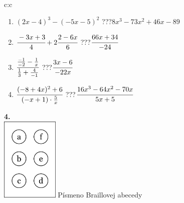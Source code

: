 \documentclass[10pt]{report}
\begin{document}
\begin{tabular}{c:c}
\begin{minipage}[c][104.5mm][t]{0.5\linewidth}
\begin{center}
\begin{minipage}{0.79\linewidth}
\begin{center}
\begin{varwidth}{\linewidth}
\begin{enumerate}
\item $(2x-4)^3-(-5x-5)^2$\quad \dotfill\; ???\;\dotfill \quad $8x^3-73x^2+46x-89$
\item $\cfrac{-3x+3}{4}+2\cfrac{2-6x}{6}$\quad \dotfill\; ???\;\dotfill \quad $\cfrac{66x+34}{-24}$
\item $\cfrac{\frac{-1}{-2}-\frac{1}{x}}{\frac{1}{3}+\frac{4}{-1}}$\quad \dotfill\; ???\;\dotfill \quad $\cfrac{3x-6}{-22x}$
\item $\cfrac{(-8+4x)^2+6}{(-x+1)\cdot\frac{5}{x}}$\quad \dotfill\; ???\;\dotfill \quad $\cfrac{16x^3-64x^2-70x}{5x+5}$
\end{enumerate}
\end{varwidth}
\end{center}
\end{minipage}
\begin{minipage}{0.20\linewidth}
\begin{center}
{\Huge\bfseries 4.} \\[2mm]
\includegraphics[height=40mm]{../images/braille.png}
{\small Písmeno Braillovej abecedy}
\end{center}
\end{minipage}
\end{center}
\end{minipage}
%
\end{tabular}
\newpage
\thispagestyle{empty}
\end{document}
